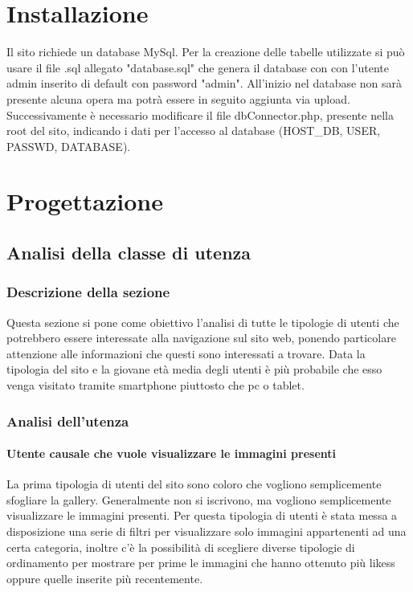 \documentclass[openany, a4paper, 12pt]{report}
\begin{document}
	\chapter{Installazione}
Il sito richiede un database MySql. Per la creazione delle tabelle utilizzate si può usare il file .sql allegato "database.sql" che genera il database con con l'utente admin inserito di default con password "admin". All'inizio nel database non sarà presente alcuna opera ma potrà essere in seguito aggiunta via upload.\\
	Successivamente è necessario modificare il file dbConnector.php, presente nella root del sito, indicando i dati per l'accesso al database (HOST\_DB, USER, PASSWD, DATABASE).\\
	
	
	\chapter{Progettazione}

	\section{Analisi della classe di utenza}

		\subsection{Descrizione della sezione}
		Questa sezione si pone come obiettivo l'analisi di tutte le tipologie di utenti che potrebbero essere interessate alla navigazione sul sito web, ponendo particolare attenzione alle informazioni che questi sono interessati a trovare. Data la tipologia del sito e la giovane età media degli utenti è più probabile che esso venga visitato tramite smartphone piuttosto che pc o tablet.\\
		\subsection{Analisi dell'utenza}
		\subsubsection{Utente causale che vuole visualizzare le immagini presenti}
		La prima tipologia di utenti del sito sono coloro che vogliono semplicemente sfogliare la gallery. Generalmente non si iscrivono, ma vogliono semplicemente visualizzare le immagini presenti.
		Per questa tipologia di utenti è stata messa a disposizione una serie di filtri per visualizzare solo immagini appartenenti ad una certa categoria, inoltre c'è la possibilità di scegliere diverse tipologie di ordinamento per mostrare per prime le immagini che hanno ottenuto più likess oppure quelle inserite più recentemente.\\
\end{document}
